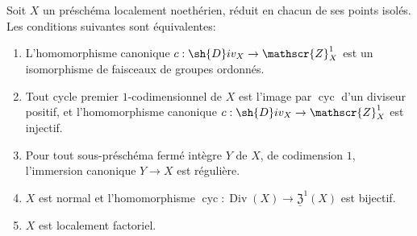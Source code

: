 \begin{proposition}[21.7.4]
\label{IV.21.7.4}
Soit $X$ un préschéma localement noethérien, réduit en chacun de ses points isolés.
Les conditions suivantes sont équivalentes:
\begin{enumerate}
  \item[\emph{a)}] L'homomorphisme canonique $c:\sh{D}iv_X\to\mathscr{Z}_X^1$  est un isomorphisme de faisceaux de groupes ordonnés.
  \item[\emph{a$'$)}] Tout cycle premier $1$-codimensionnel de $X$ est l'image par $\operatorname{cyc}$ d'un diviseur positif, et l'homomorphisme canonique $c:\sh{D}iv_X\to\mathscr{Z}_X^1$ est injectif.
  \item[\emph{a$''$)}] Pour tout sous-préschéma fermé intègre $Y$ de $X$, de codimension $1$, l'immersion canonique $Y\to X$ est régulière.
  \item[\emph{b)}] $X$ est normal et l'homomorphisme $\operatorname{cyc}:\operatorname{Div}(X)\to\underline{\mathfrak{Z}}^1(X)$ est bijectif.
  \item[\emph{c)}] $X$ est localement factoriel.
\end{enumerate}
\end{proposition}

